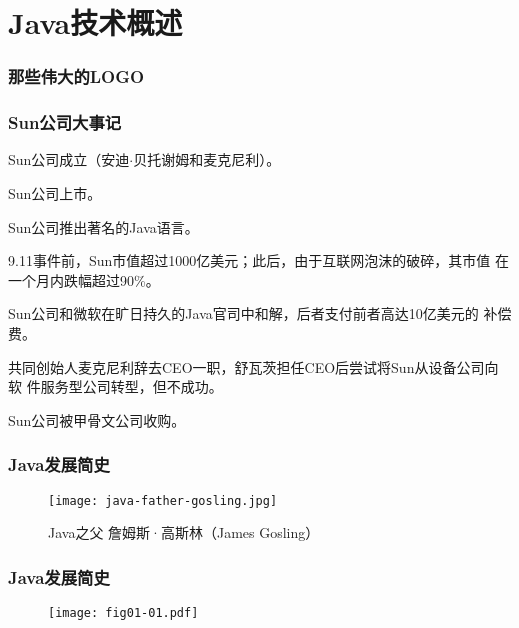 \section{Java技术概述}
\begin{frame}[fragile] %
  \frametitle{那些伟大的LOGO}
  \begin{figure}
    \centering
  \end{figure}
  \begin{figure}
    \centering
  \end{figure}
  \begin{figure}
    \centering
  \end{figure}
\end{frame}

\begin{frame}[fragile] %
\frametitle{Sun公司大事记}
\begin{description}\msyh\small
\item[\fbox{1982}] Sun公司成立（安迪$\cdot$贝托谢姆和麦克尼利）。
\item[\fbox{1986}] Sun公司上市。
\item[\fbox{1985}] Sun公司推出著名的Java语言。
\item[\fbox{2001}] 9.11事件前，Sun市值超过1000亿美元；此后，由于互联网泡沫的破碎，其市值
  在一个月内跌幅超过90\%。
\item[\fbox{2004}] Sun公司和微软在旷日持久的Java官司中和解，后者支付前者高达10亿美元的
  补偿费。
\item[\fbox{2006}] 共同创始人麦克尼利辞去CEO一职，舒瓦茨担任CEO后尝试将Sun从设备公司向软
  件服务型公司转型，但不成功。
\item[\fbox{2010}] Sun公司被甲骨文公司收购。
\end{description}
\end{frame}

\begin{frame}[fragile] %
\frametitle{Java发展简史}
\begin{figure}
\centering
\texttt{[image: java-father-gosling.jpg]}
\caption{Java之父 詹姆斯·高斯林（James Gosling）}
\end{figure}
\end{frame}

\begin{frame}[fragile] %
\frametitle{Java发展简史}
\begin{figure}
\centering
\texttt{[image: fig01-01.pdf]}
\end{figure}
\end{frame}

